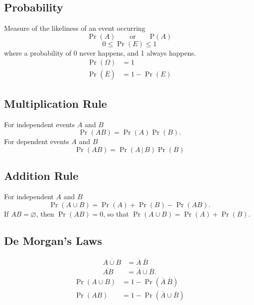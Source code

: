 \documentclass{article}
\begin{document}
\begin{multicols}{3}
    \subsection{Probability}
    Measure of the likeliness of an event occurring
    \begin{equation*}
        \Pr{\left( A \right)} \quad\quad \text{or} \quad\quad \mathrm{P}\left( A \right)
    \end{equation*}
    \begin{equation*}
        0 \leq \Pr{\left( E \right)} \leq 1
    \end{equation*}
    where a probability of 0 never happens, and 1 always happens.
    \begin{align*}
        \Pr{\left( \Omega \right)}       & = 1                         \\
        \Pr{\left( \overline{E} \right)} & = 1 - \Pr{\left( E \right)}
    \end{align*}
    \subsection{Multiplication Rule}
    For independent events \(A\) and \(B\)
    \begin{equation*}
        \Pr{\left( AB \right)} = \Pr{\left( A \right)} \Pr{\left( B \right)}.
    \end{equation*}
    For dependent events \(A\) and \(B\)
    \begin{equation*}
        \Pr{\left( AB \right)} = \Pr{\left( A \,\vert \, B \right)} \Pr{\left( B \right)}
    \end{equation*}
    \subsection{Addition Rule}
    For independent \(A\) and \(B\)
    \begin{equation*}
        \Pr{\left( A \cup B \right)} = \Pr{\left( A \right)} + \Pr{\left( B \right)} - \Pr{\left( AB \right)}.
    \end{equation*}
    If \(AB = \varnothing \), then \(\Pr{\left( AB \right)} = 0\), so that \(\Pr{\left( A \cup B \right)} = \Pr{\left( A \right)} + \Pr{\left( B \right)}\).
    \subsection{De Morgan's Laws}
    \begin{align*}
        \overline{A \cup B} & = \overline{A} \ \overline{B}     \\
        \overline{AB}       & = \overline{A} \cup \overline{B}.
    \end{align*}
    \begin{align*}
        \Pr{\left( A \cup B \right)} & = 1 - \Pr{\left( \overline{A} \ \overline{B} \right)}    \\
        \Pr{\left( AB \right)}       & = 1 - \Pr{\left( \overline{A} \cup \overline{B} \right)}
    \end{align*}

\end{multicols}
\end{document}
